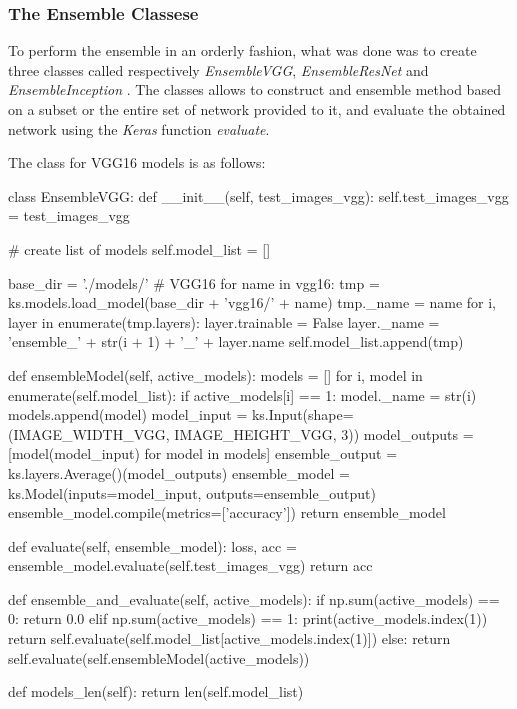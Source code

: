 \subsubsection{The Ensemble Classese}
To perform the ensemble in an orderly fashion, what was done was to create three classes called respectively \textit{EnsembleVGG}, \textit{EnsembleResNet} and \textit{EnsembleInception} . The classes allows to construct and ensemble method based on a subset or the entire set of network provided to it, and evaluate the obtained network using the \textit{Keras} function \textit{evaluate}.

The class for VGG16 models is as follows:

\begin{python}
class EnsembleVGG:
    def __init__(self, test_images_vgg):
        self.test_images_vgg = test_images_vgg

        # create list of models
        self.model_list = []

        base_dir = './models/'
        # VGG16
        for name in vgg16:
            tmp = ks.models.load_model(base_dir + 'vgg16/' + name)
            tmp._name = name
            for i, layer in enumerate(tmp.layers):
                layer.trainable = False
                layer._name = 'ensemble_' + str(i + 1) + '_' + layer.name
            self.model_list.append(tmp)


    def ensembleModel(self, active_models):
        models = []
        for i, model in enumerate(self.model_list):
            if active_models[i] == 1:
                model._name = str(i)
                models.append(model)
        model_input = ks.Input(shape=(IMAGE_WIDTH_VGG, IMAGE_HEIGHT_VGG, 3))
        model_outputs = [model(model_input) for model in models]
        ensemble_output = ks.layers.Average()(model_outputs)
        ensemble_model = ks.Model(inputs=model_input, outputs=ensemble_output)
        ensemble_model.compile(metrics=['accuracy'])
        return ensemble_model

    def evaluate(self, ensemble_model):
        loss, acc = ensemble_model.evaluate(self.test_images_vgg)
        return acc

    def ensemble_and_evaluate(self, active_models):
        if np.sum(active_models) == 0:
            return 0.0
        elif np.sum(active_models) == 1:
            print(active_models.index(1))
            return self.evaluate(self.model_list[active_models.index(1)])
        else:
            return self.evaluate(self.ensembleModel(active_models))

    def models_len(self):
        return len(self.model_list)
\end{python}

